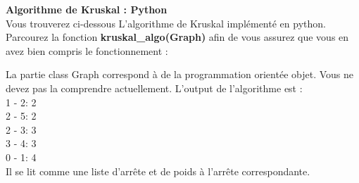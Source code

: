 \begin{Exercice}[15 minutes] \textbf{Algorithme de Kruskal : Python}\\
    Vous trouverez ci-dessous L'algorithme de Kruskal implémenté en python. Parcourez la fonction \textbf{kruskal\_algo(Graph)} afin de vous assurez que vous en avez bien compris le fonctionnement :\\
    
    \begin{conseil}
        La partie class Graph correspond à de la programmation orientée objet. Vous ne devez pas la comprendre actuellement. L'output de l'algorithme est : \\
        1 - 2: 2\\
        2 - 5: 2\\
        2 - 3: 3\\
        3 - 4: 3\\
        0 - 1: 4\\
        Il se lit comme une liste d'arrête et de poids à l'arrête correspondante.
    \end{conseil}
\end{Exercice}

\newpage

